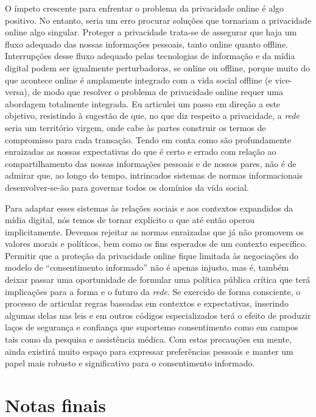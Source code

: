 O ímpeto crescente para enfrentar o problema da privacidade online é
algo positivo. No entanto, seria um erro procurar soluções que tornariam
a privacidade online algo singular. Proteger a privacidade trata-se de
assegurar que haja um fluxo adequado das nossas informações pessoais,
tanto online quanto offline. Interrupções desse fluxo adequado pelas
tecnologias de informação e da mídia digital podem ser igualmente
perturbadoras, se online ou offline, porque muito do que acontece online
é amplamente integrado com a vida social offline (e vice-versa), de modo
que resolver o problema de privacidade online requer uma abordagem
totalmente integrada. Eu articulei um passo em direção a este objetivo,
resistindo à sugestão de que, no que diz respeito a privacidade, a
\emph{rede} seria um território virgem, onde cabe às partes construir os
termos de compromisso para cada transação. Tendo em conta como são
profundamente enraizadas as nossas expectativas do que é certo e errado
com relação ao compartilhamento das nossas informações pessoais e de
nossos pares, não é de admirar que, ao longo do tempo, intrincados
sistemas de normas informacionais desenvolver-se-ão para governar todos
os domínios da vida social.

Para adaptar esses sistemas às relações sociais e aos contextos
expandidos da mídia digital, nós temos de tornar explícito o que até
então operou implicitamente. Devemos rejeitar as normas enraizadas que
já não promovem os valores morais e políticos, bem como os fins
esperados de um contexto específico. Permitir que a proteção da
privacidade online fique limitada às negociações do modelo de
``consentimento informado'' não é apenas injusto, mas é, também deixar
passar uma oportunidade de formular uma política pública crítica que
terá implicações para a forma e o futuro da \emph{rede}. Se exercido de
forma consciente, o processo de articular regras baseadas em contextos e
expectativas, inserindo algumas delas nas leis e em outros códigos
especializados terá o efeito de produzir laços de segurança e confiança
que suportemo consentimento como em campos tais como da pesquisa e
assistência médica. Com estas precauções em mente, ainda existirá muito
espaço para expressar preferências pessoais e manter um papel mais
robusto e significativo para o consentimento informado.

\section{Notas finais}

